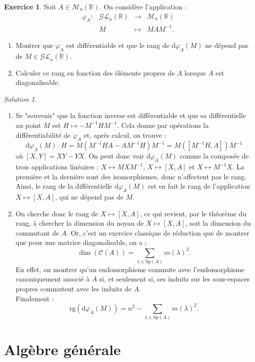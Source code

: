 \documentclass[french]{book}
\newcommand{\R}{\mathbb{R}}
\newcommand{\inv}{^{-1}}
\newcommand{\rg}{\text{rg}}
\renewcommand{\d}{\text{d}}
\theoremstyle{definition}
\newtheorem{ex}{Exercice}[chapter]
\theoremstyle{remark}
\newtheorem*{sol}{Solution}
\begin{document}
\begin{ex}
	Soit $A\in\mathcal{M}_n(\R)$. On considère l'application :
	$$\begin{array}{lrcl}
		\varphi_A:&\mathcal{GL}_n(\R)&\longrightarrow&\mathcal{M}_n(\R)\\
		&M&\longmapsto&MAM\inv.
	\end{array}$$
	\begin{enumerate}
		\item Montrer que $\varphi_A$ est différentiable et que le rang de $\d \varphi_A(M)$ ne dépend pas de $M\in\mathcal{GL}_n(\R)$.
		\item Calculer ce rang en fonction des éléments propres de $A$ lorsque $A$ est diagonalisable.	
	\end{enumerate}
\end{ex}
\begin{sol}
	\begin{enumerate}
		\item Se "souvenir" que la fonction inverse est différentiable et que sa différentielle au point $M$ est $H\mapsto -M\inv HM\inv$. Cela donne par opérations la différentiabilité de $\varphi_A$ et, après calcul, on trouve :
		$$\d\varphi_A(M)\cdot H=M(M\inv HA-AM\inv H)M\inv=M([M\inv H, A])M\inv$$ où $[X,Y]=XY-YX$. On peut donc voir $\d\varphi_A(M)$ comme la composée de trois applications linéaires : $X\mapsto MXM\inv$, $X\mapsto [X,A]$ et $X\mapsto M\inv X$. La première et la dernière sont des isomorphismes, donc n'affectent pas le rang. Ainsi, le rang de la différentielle $\d\varphi_A(M)$ est en fait le rang de l'application $X\mapsto [X,A]$, qui ne dépend pas de $M$.
		\item On cherche donc le rang de $X\mapsto [X,A]$, ce qui revient, par le théorème du rang, à chercher la dimension du noyau de $X\mapsto[X,A]$, soit la dimension du commutant de $A$. Or, c'est un exercice classique de réduction que de montrer que pour une matrice diagonalisable, on a :
		$$\dim(\mathcal{C}(A))=\sum_{\lambda\in\text{Sp}(A)}m(\lambda)^2.$$En effet, on montrer qu'un endomorphisme commute avec l'endomorphisme canoniquement associé à $A$ si, et seulement si, ses induits sur les sous-espaces propres commutent avec les induits de $A$.\\
		Finalement :
		$$\rg(\d\varphi_A(M))=n^2-\sum_{\lambda\in\text{Sp}(A)}m(\lambda)^2.$$ 
	\end{enumerate}
\end{sol}

\chapter{Algèbre générale}
\end{document}
